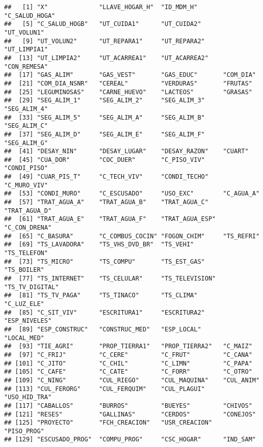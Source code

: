 \documentclass[11pt,]{article}
\begin{document}
\begin{verbatim}
##   [1] "X"              "LLAVE_HOGAR_H"  "ID_MDM_H"       "C_SALUD_HOGA"  
##   [5] "C_SALUD_HOGB"   "UT_CUIDA1"      "UT_CUIDA2"      "UT_VOLUN1"     
##   [9] "UT_VOLUN2"      "UT_REPARA1"     "UT_REPARA2"     "UT_LIMPIA1"    
##  [13] "UT_LIMPIA2"     "UT_ACARREA1"    "UT_ACARREA2"    "CON_REMESA"    
##  [17] "GAS_ALIM"       "GAS_VEST"       "GAS_EDUC"       "COM_DIA"       
##  [21] "COM_DIA_NSNR"   "CEREAL"         "VERDURAS"       "FRUTAS"        
##  [25] "LEGUMINOSAS"    "CARNE_HUEVO"    "LACTEOS"        "GRASAS"        
##  [29] "SEG_ALIM_1"     "SEG_ALIM_2"     "SEG_ALIM_3"     "SEG_ALIM_4"    
##  [33] "SEG_ALIM_5"     "SEG_ALIM_A"     "SEG_ALIM_B"     "SEG_ALIM_C"    
##  [37] "SEG_ALIM_D"     "SEG_ALIM_E"     "SEG_ALIM_F"     "SEG_ALIM_G"    
##  [41] "DESAY_NIN"      "DESAY_LUGAR"    "DESAY_RAZON"    "CUART"         
##  [45] "CUA_DOR"        "COC_DUER"       "C_PISO_VIV"     "CONDI_PISO"    
##  [49] "CUAR_PIS_T"     "C_TECH_VIV"     "CONDI_TECHO"    "C_MURO_VIV"    
##  [53] "CONDI_MURO"     "C_ESCUSADO"     "USO_EXC"        "C_AGUA_A"      
##  [57] "TRAT_AGUA_A"    "TRAT_AGUA_B"    "TRAT_AGUA_C"    "TRAT_AGUA_D"   
##  [61] "TRAT_AGUA_E"    "TRAT_AGUA_F"    "TRAT_AGUA_ESP"  "C_CON_DRENA"   
##  [65] "C_BASURA"       "C_COMBUS_COCIN" "FOGON_CHIM"     "TS_REFRI"      
##  [69] "TS_LAVADORA"    "TS_VHS_DVD_BR"  "TS_VEHI"        "TS_TELEFON"    
##  [73] "TS_MICRO"       "TS_COMPU"       "TS_EST_GAS"     "TS_BOILER"     
##  [77] "TS_INTERNET"    "TS_CELULAR"     "TS_TELEVISION"  "TS_TV_DIGITAL" 
##  [81] "TS_TV_PAGA"     "TS_TINACO"      "TS_CLIMA"       "C_LUZ_ELE"     
##  [85] "C_SIT_VIV"      "ESCRITURA1"     "ESCRITURA2"     "ESP_NIVELES"   
##  [89] "ESP_CONSTRUC"   "CONSTRUC_MED"   "ESP_LOCAL"      "LOCAL_MED"     
##  [93] "TIE_AGRI"       "PROP_TIERRA1"   "PROP_TIERRA2"   "C_MAIZ"        
##  [97] "C_FRIJ"         "C_CERE"         "C_FRUT"         "C_CANA"        
## [101] "C_JITO"         "C_CHIL"         "C_LIMN"         "C_PAPA"        
## [105] "C_CAFE"         "C_CATE"         "C_FORR"         "C_OTRO"        
## [109] "C_NING"         "CUL_RIEGO"      "CUL_MAQUINA"    "CUL_ANIM"      
## [113] "CUL_FERORG"     "CUL_FERQUIM"    "CUL_PLAGUI"     "USO_HID_TRA"   
## [117] "CABALLOS"       "BURROS"         "BUEYES"         "CHIVOS"        
## [121] "RESES"          "GALLINAS"       "CERDOS"         "CONEJOS"       
## [125] "PROYECTO"       "FCH_CREACION"   "USR_CREACION"   "PISO_PROG"     
## [129] "ESCUSADO_PROG"  "COMPU_PROG"     "CSC_HOGAR"      "IND_SAM"
\end{verbatim}
\end{document}
